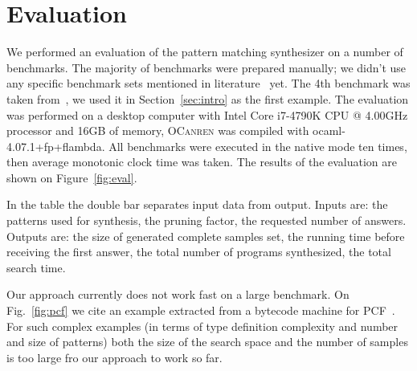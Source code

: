 \section{Evaluation}
\label{sec:eval}


We performed an evaluation of the pattern matching synthesizer on a number of benchmarks.
The majority of benchmarks were prepared manually; we didn't use any specific benchmark sets mentioned in literature~\cite{Scott2000WhenDM} yet.
The 4th benchmark was taken from~\cite{maranget2008}, we used it in Section~\ref{sec:intro} as the first example. 
The evaluation was performed on a desktop computer with Intel Core i7-4790K CPU @ 4.00GHz processor and 16GB of memory,
\textsc{OCanren} was compiled with \mbox{ocaml-4.07.1+fp+flambda}. All benchmarks were executed in the native mode ten times,
then average monotonic clock time was taken. The results of the evaluation are shown on Figure~\ref{fig:eval}.

In the table the double bar separates input data from output. Inputs are: the patterns used for synthesis, the pruning factor,
the requested number of answers. Outputs are: the size of generated complete samples set, the running time before receiving the
first answer, the total number of programs synthesized, the total search time.

Our approach currently does not work fast on a large benchmark. On Fig.~\ref{fig:pcf} we cite an example extracted from a bytecode
machine for PCF~\cite{Plotkin1977LCFCA,maranget2008}. For such complex examples (in terms of type definition complexity and number and size of patterns)
both the size of the search space and the number of samples is too large fro our approach to work so far.



